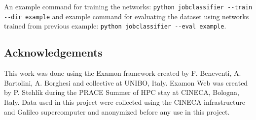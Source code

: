 \documentclass[11pt,a4paper]{article}
\begin{document}
An example command for training the networks: \texttt{python jobclassifier -{}-train -{}-dir example} and example command for evaluating the dataset using networks trained from previous example: \texttt{python jobclassifier -{}-eval example}.


\subsection*{Acknowledgements}
This work was done using the Examon framework created by F. Beneventi, A. Bartolini, A. Borghesi and collective at UNIBO, Italy. Examon Web was created by P. Stehlík during the PRACE Summer of HPC stay at CINECA, Bologna, Italy. Data used in this project were collected using the CINECA infrastructure and Galileo supercomputer and anonymized before any use in this project.

{}

\end{document}
